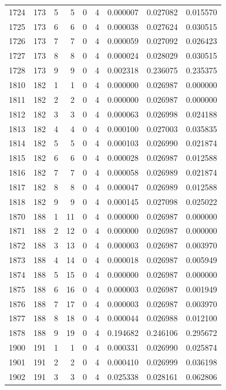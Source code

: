\begin{longtable}{rrrrrrrrr}
1724 & 173 & 5 & 5 & 0 & 4 & 0.000007 & 0.027082 & 0.015570 \\
1725 & 173 & 6 & 6 & 0 & 4 & 0.000038 & 0.027624 & 0.030515 \\
1726 & 173 & 7 & 7 & 0 & 4 & 0.000059 & 0.027092 & 0.026423 \\
1727 & 173 & 8 & 8 & 0 & 4 & 0.000024 & 0.028029 & 0.030515 \\
1728 & 173 & 9 & 9 & 0 & 4 & 0.002318 & 0.236075 & 0.235375 \\
1810 & 182 & 1 & 1 & 0 & 4 & 0.000000 & 0.026987 & 0.000000 \\
1811 & 182 & 2 & 2 & 0 & 4 & 0.000000 & 0.026987 & 0.000000 \\
1812 & 182 & 3 & 3 & 0 & 4 & 0.000063 & 0.026998 & 0.024188 \\
1813 & 182 & 4 & 4 & 0 & 4 & 0.000100 & 0.027003 & 0.035835 \\
1814 & 182 & 5 & 5 & 0 & 4 & 0.000103 & 0.026990 & 0.021874 \\
1815 & 182 & 6 & 6 & 0 & 4 & 0.000028 & 0.026987 & 0.012588 \\
1816 & 182 & 7 & 7 & 0 & 4 & 0.000058 & 0.026989 & 0.021874 \\
1817 & 182 & 8 & 8 & 0 & 4 & 0.000047 & 0.026989 & 0.012588 \\
1818 & 182 & 9 & 9 & 0 & 4 & 0.000145 & 0.027098 & 0.025022 \\
1870 & 188 & 1 & 11 & 0 & 4 & 0.000000 & 0.026987 & 0.000000 \\
1871 & 188 & 2 & 12 & 0 & 4 & 0.000000 & 0.026987 & 0.000000 \\
1872 & 188 & 3 & 13 & 0 & 4 & 0.000003 & 0.026987 & 0.003970 \\
1873 & 188 & 4 & 14 & 0 & 4 & 0.000018 & 0.026987 & 0.005949 \\
1874 & 188 & 5 & 15 & 0 & 4 & 0.000000 & 0.026987 & 0.000000 \\
1875 & 188 & 6 & 16 & 0 & 4 & 0.000003 & 0.026987 & 0.001949 \\
1876 & 188 & 7 & 17 & 0 & 4 & 0.000003 & 0.026987 & 0.003970 \\
1877 & 188 & 8 & 18 & 0 & 4 & 0.000044 & 0.026988 & 0.012100 \\
1878 & 188 & 9 & 19 & 0 & 4 & 0.194682 & 0.246106 & 0.295672 \\
1900 & 191 & 1 & 1 & 0 & 4 & 0.000331 & 0.026990 & 0.025874 \\
1901 & 191 & 2 & 2 & 0 & 4 & 0.000410 & 0.026999 & 0.036198 \\
1902 & 191 & 3 & 3 & 0 & 4 & 0.025338 & 0.028161 & 0.062806 \\

\end{longtable}
